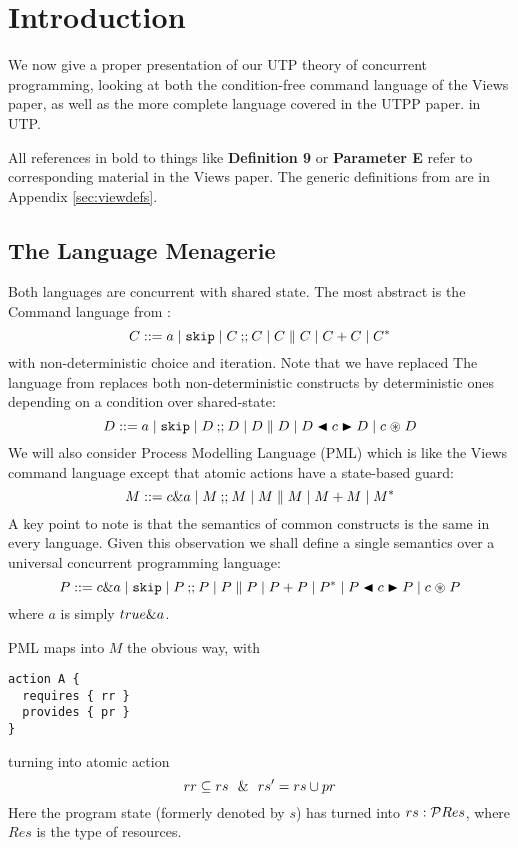 \section{Introduction}\label{sec:intro}

We now give a proper presentation of our UTP theory
of concurrent programming, looking at both the condition-free command language
of the Views paper\cite{conf/popl/Dinsdale-YoungBGPY13},
as well as the more complete language covered in the UTPP paper\cite{DBLP:conf/icfem/WoodcockH02}.
in UTP.

All references in bold to things
like \textbf{Definition 9} or \textbf{Parameter E} refer to corresponding material
in the Views paper.
The generic definitions from\cite{conf/popl/Dinsdale-YoungBGPY13}
are in Appendix \ref{sec:viewdefs}.

\subsection{The Language Menagerie}

Both languages are concurrent with shared state.
The most abstract is the Command language from \cite{conf/popl/Dinsdale-YoungBGPY13}:
\[
 C ::= a \mid \texttt{skip} \mid C \mathbin{;\!;} C \mid C \parallel C \mid C+C \mid C^*
\]
with non-deterministic choice and iteration.
Note that we have replaced
The language from \cite{DBLP:conf/icfem/WoodcockH02} replaces both
non-deterministic constructs by deterministic ones depending
on a condition over shared-state:
\[
 D ::= a \mid \texttt{skip} \mid D \mathbin{;\!;} D \mid D \parallel D \mid D \mathrel{\blacktriangleleft{c}\blacktriangleright} D \mid c \mathrel{\circledast} D
\]
We will also consider Process Modelling Language (PML)\cite{DBLP:journals/infsof/AtkinsonWN07}
which is like the Views command language except that atomic actions
have a state-based guard:
\[
 M ::= c \& a \mid M \mathbin{;\!;} M \mid M \parallel M \mid M+M \mid M^*
\]
A key point to note is that the semantics of common constructs is the same
in every language.
Given this observation we shall define a single semantics over
a universal concurrent programming language:
\[
 P ::= c \& a \mid \texttt{skip} \mid P \mathbin{;\!;} P  \mid P \parallel P
   \mid P+P\mid P^*
   \mid P \mathrel{\blacktriangleleft{c}\blacktriangleright} P \mid c \mathrel{\circledast} P
\]
where $a$ is simply $true\& a$.

PML maps into $M$ the obvious way,
with
\begin{verbatim}
action A {
  requires { rr }
  provides { pr }
}
\end{verbatim}
turning into atomic action
\[
rr \subseteq rs ~~\&~~ rs' = rs \cup pr
\]
Here the program state (formerly denoted by $s$)
has turned into $rs:\mathcal{P} Res$, where $Res$ is the type of resources.